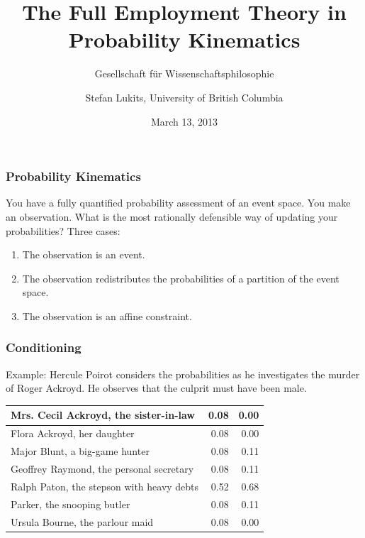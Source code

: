 \documentclass[xcolor=dvipsnames]{beamer}
\title{The Full Employment Theory \linebreak in Probability Kinematics}
\subtitle{Gesellschaft f{\"u}r Wissenschaftsphilosophie}
\author{Stefan Lukits, University of British Columbia}
\date{March 13, 2013}
\begin{document}
\begin{frame}
  \titlepage
\end{frame}

\begin{frame}
  \frametitle{Probability Kinematics}
  You have a fully quantified probability assessment of an event
  space. You make an observation. What is the most rationally
  defensible way of updating your probabilities? Three cases:
  \begin{enumerate}
  \item The observation is an event.
  \item The observation redistributes the probabilities of a
    partition of the event space.
  \item The observation is an affine constraint.
  \end{enumerate}
\end{frame}

\begin{frame}
  \frametitle{Conditioning}
  Example: Hercule Poirot considers the probabilities as he
  investigates the murder of Roger Ackroyd. He observes that the
  culprit must have been male.

\mbox{}

\mbox{}

  \begin{tabular}{|l|r|r|} \hline
    Mrs. Cecil Ackroyd, the sister-in-law & 0.08 & 0.00 \\ \hline
    Flora Ackroyd, her daughter & 0.08 & 0.00 \\ \hline
    Major Blunt, a big-game hunter & 0.08 & 0.11 \\ \hline
    Geoffrey Raymond, the personal secretary & 0.08 & 0.11 \\ \hline
    Ralph Paton, the stepson with heavy debts & 0.52 & 0.68 \\ \hline
    Parker, the snooping butler & 0.08 & 0.11 \\ \hline
    Ursula Bourne, the parlour maid & 0.08 & 0.00 \\ \hline
  \end{tabular}
\end{frame}
\end{document}
